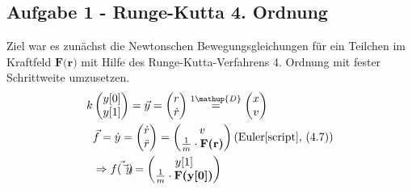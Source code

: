 \subsection*{Aufgabe 1 - Runge-Kutta 4. Ordnung}
Ziel war es zunächst die Newtonschen Bewegungsgleichungen für ein Teilchen im Kraftfeld $\textbf{F(r)}$ mit Hilfe des Runge-Kutta-Verfahrens 4. Ordnung mit fester Schrittweite umzusetzen.
\begin{equation}
	\begin{split}
 k		&\begin{pmatrix}
			y[0] \\
			y[1] \\
		\end{pmatrix} =	
		\vec{y} = 
		\begin{pmatrix}
			r \\
			\dot{r} \\
		\end{pmatrix} \stackrel{1\mathup{D}}{=}
		\begin{pmatrix}
			x \\
			v \\
		\end{pmatrix} \\	
		& \vec{f} = \dot{y} =
		\begin{pmatrix}
			\dot{r} \\
			\ddot{r} \\
		\end{pmatrix} = 
		\begin{pmatrix}
			v \\
			\frac{1}{m} \cdot \textbf{F(r)} \\
		\end{pmatrix} \text{(Euler\cite[48]{script}, (4.7))} \\
		& \Rightarrow \vec{f(\vec{y})} = 
		\begin{pmatrix}
			y[1] \\
			\frac{1}{m} \cdot \textbf{F(y[0])} \\
		\end{pmatrix}
	\end{split}
	\label{rk4}
\end{equation}

